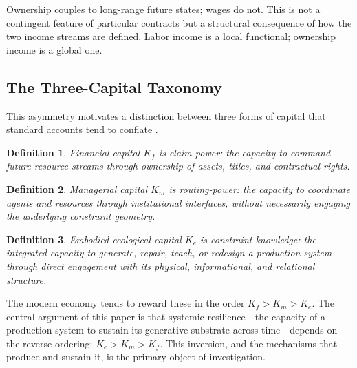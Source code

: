 \documentclass[12pt]{article}
\newtheorem{definition}{Definition}
\begin{document}
Ownership couples to long-range future states; wages do not. This is not a contingent feature of particular contracts but a structural consequence of how the two income streams are defined. Labor income is a local functional; ownership income is a global one.

\subsection{The Three-Capital Taxonomy}

This asymmetry motivates a distinction between three forms of capital that standard accounts tend to conflate \cite{Piketty2014,Harvey2005}.

\begin{definition}
\emph{Financial capital} $K_f$ is claim-power: the capacity to command future resource streams through ownership of assets, titles, and contractual rights.
\end{definition}

\begin{definition}
\emph{Managerial capital} $K_m$ is routing-power: the capacity to coordinate agents and resources through institutional interfaces, without necessarily engaging the underlying constraint geometry.
\end{definition}

\begin{definition}
\emph{Embodied ecological capital} $K_e$ is constraint-knowledge: the integrated capacity to generate, repair, teach, or redesign a production system through direct engagement with its physical, informational, and relational structure.
\end{definition}

The modern economy tends to reward these in the order $K_f > K_m > K_e$. The central argument of this paper is that systemic resilience---the capacity of a production system to sustain its generative substrate across time---depends on the reverse ordering: $K_e > K_m > K_f$. This inversion, and the mechanisms that produce and sustain it, is the primary object of investigation.
\end{document}
